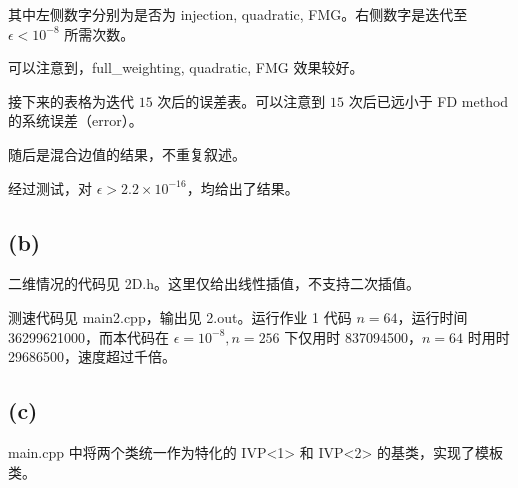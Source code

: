 \documentclass[12pt]{ctexart}
\begin{document}
其中左侧数字分别为是否为 injection, quadratic, FMG。右侧数字是迭代至 $\epsilon<10^{-8}$ 所需次数。

可以注意到，full\_weighting, quadratic, FMG 效果较好。

接下来的表格为迭代 $15$ 次后的误差表。可以注意到 $15$ 次后已远小于 FD method 的系统误差（error）。

随后是混合边值的结果，不重复叙述。

经过测试，对 $\epsilon>2.2\times 10^{-16}$，均给出了结果。

\subsection*{(b)}

二维情况的代码见 2D.h。这里仅给出线性插值，不支持二次插值。

测速代码见 main2.cpp，输出见 2.out。运行作业 1 代码 $n=64$，运行时间 36299621000，而本代码在 $\epsilon=10^{-8},n=256$ 下仅用时 837094500，$n=64$ 时用时 29686500，速度超过千倍。

\subsection*{(c)}

main.cpp 中将两个类统一作为特化的 IVP<1> 和 IVP<2> 的基类，实现了模板类。
\end{document}
